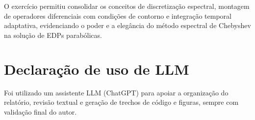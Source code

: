 \documentclass[12pt,a4paper]{article}
\begin{document}
O exercício permitiu consolidar os conceitos de discretização espectral, montagem de operadores diferenciais com condições de contorno e integração temporal adaptativa, evidenciando o poder e a elegância do método espectral de Chebyshev na solução de EDPs parabólicas.



\section{Declaração de uso de LLM}
Foi utilizado um assistente LLM (ChatGPT) para apoiar a organização do relatório, revisão textual e geração de trechos de código e figuras, sempre com validação final do autor.
\end{document}
